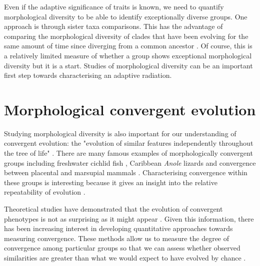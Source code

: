 	
	Even if the adaptive significance of traits is known, we need to quantify morphological diversity to be able to identify exceptionally diverse groups. One approach is through sister taxa comparisons. This has the advantage of comparing the morphological diversity of clades that have been evolving for the same amount of time since diverging from a common ancestor \citep{Losos2002}. Of course, this is a relatively limited measure of whether a group shows exceptional morphological diversity but it is a start.
	Studies of morphological diversity can be an important first step towards characterising an adaptive radiation.
\section{Morphological convergent evolution}

	Studying morphological diversity is also important for our understanding of convergent evolution: the "evolution of similar features independently throughout the tree of life" \citep[Futuyma 1998, cited in][]{Losos2011}. There are many famous examples of morphologically convergent groups including freshwater cichlid fish \citep{Muschick2012}, Caribbean \textit{Anole} lizards \citep{Mahler2013} and convergence between placental and marsupial mammals \citep{Wroe2007}. Characterising convergence within these groups is interesting because it gives an insight into the relative repeatability of evolution \citep{Losos2011}.


	Theoretical studies have demonstrated that the evolution of convergent phenotypes is not as surprising as it might appear \citep{Stayton2008}. Given this information, there has been increasing interest in developing quantitative approaches towards measuring convergence. These methods allow us to measure the degree of convergence among particular groups so that we can assess whether observed similarities are greater than what we would expect to have evolved by chance \citep[e.g.][]{Muschick2012}.
	
